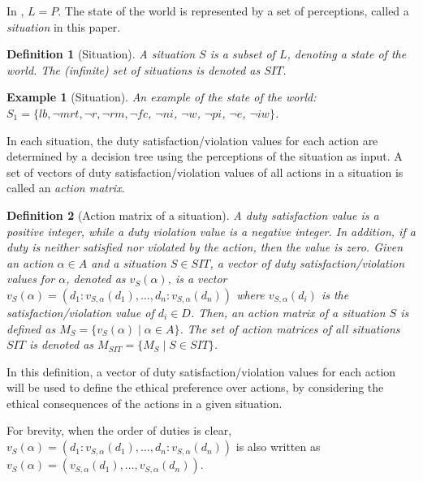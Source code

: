 \documentclass[letterpaper]{article} %
\newtheorem{definition}{Definition}
\newtheorem{example}{Example}
\begin{document}
In \cite{DBLP:journals/pieee/Anderson19}, $L = P$. The state of the world is represented by a set of perceptions, called a \emph{situation} in this paper. 

\begin{definition}[Situation]
A situation $S$ is a subset of $L$, denoting a state of the world. %
The (infinite) set of situations is denoted as $SIT$. 
\end{definition}

\begin{example}[Situation]
An example of the state of the world: $S_1 = \{lb,  \neg mrt, \neg r, \neg rm, \neg fc$, $\neg ni$, $\neg w$, $\neg pi$, $\neg e$, $\neg iw\}$.
\end{example}

In each situation, the duty satisfaction/violation values for each action are determined by a decision tree using the perceptions of the situation as input. A set of vectors of duty satisfaction/violation values of all actions in a situation is called an \emph{action matrix}. 

\begin{definition}[Action matrix of a situation]
A duty satisfaction value is a positive integer, while a duty violation value is a negative integer. In addition, if a duty is neither satisfied nor violated by the action, then the value is zero. Given an action $\alpha\in A$ and a situation $S\in SIT$, a vector of duty satisfaction/violation values for $\alpha$, denoted as  $v_S(\alpha)$, is a vector $v_S(\alpha) = ( d_1: v_{S, \alpha}(d_1), \dots, d_n: v_{S, \alpha}(d_n)  )$ where $v_{S, \alpha}(d_i)$ is the satisfaction/violation value of $d_i\in D$. Then, an action matrix of a situation $S$ is defined as $M_S = \{v_S(\alpha) \mid \alpha\in A\}$. The set of action matrices of all situations $SIT$ is denoted as $M_{SIT} = \{M_S \mid S\in SIT\}$. 
\end{definition}

In this definition, a vector of duty satisfaction/violation values for each action will be used to define the ethical preference over actions, by considering the ethical consequences of the actions in a given situation. 

For brevity, when the order of duties is clear,  $v_S(\alpha) = ( d_1: v_{S, \alpha}(d_1), \dots, d_n: v_{S, \alpha}(d_n)  )$ is also written as $v_S(\alpha) = ( v_{S, \alpha}(d_1), \dots,  v_{S, \alpha}(d_n)  )$. 
\end{document}
